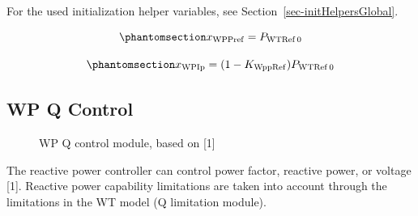 \documentclass[
  a4paper,
  DIV=11,
  numbers=noendperiod]{scrartcl}
\begin{document}
For the used initialization helper variables, see
Section~\ref{sec-initHelpersGlobal}.

\begin{equation}\phantomsection\label{eq-initXwppref}{
x_\mathrm{WPPref} = P_\mathrm{WTRef\,0}
}\end{equation}

\begin{equation}\phantomsection\label{eq-initXwpip}{
x_\mathrm{WPIp} = (1-K_\mathrm{WppRef})P_\mathrm{WTRef\,0}
}\end{equation}

\subsection{WP Q Control}\label{wp-q-control}

\begin{figure}


\caption{\label{fig-wpReactivePower}WP Q control module, based on
{[}1{]}}

\end{figure}%

The reactive power controller can control power factor, reactive power,
or voltage {[}1{]}. Reactive power capability limitations are taken into
account through the limitations in the WT model (Q limitation module).
\end{document}
